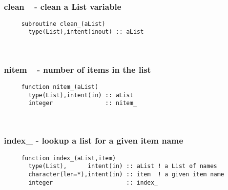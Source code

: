 \mbox{}\hrulefill\ 
 

  \subsubsection{clean\_ - clean a List variable}

\begin{verbatim} 
     subroutine clean_(aList)
       type(List),intent(inout) :: aList
 \end{verbatim} %
 
 
\mbox{}\hrulefill\ 
 
\subsubsection{nitem\_ - number of items in the list}

\begin{verbatim} 
     function nitem_(aList)
       type(List),intent(in) :: aList
       integer               :: nitem_
 \end{verbatim} %
 
 
\mbox{}\hrulefill\ 
 
 \subsubsection{index\_ - lookup a list for a given item name}

\begin{verbatim} 
     function index_(aList,item)
       type(List),      intent(in) :: aList	! a List of names
       character(len=*),intent(in) :: item	! a given item name
       integer                     :: index_
 \end{verbatim} %
 
